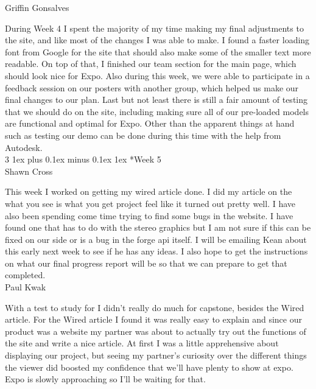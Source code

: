 \documentclass[letterpaper, 10pt, draftclsnofoot, compsoc, onecolumn]{IEEEtran}
\makeatletter
\def\subsubsection{\@startsection{subsubsection}%
                                 {3}%
                                 {\z@}%
                                 {1ex plus 0.1ex minus 0.1ex}%
                                 {1ex}%
                                 {\normalfont\normalsize}}%
\makeatother
\begin{document}
Griffin Gonsalves

During Week 4 I spent the majority of my time making my final adjustments to the site, and like most of the changes I was able to make. I found a faster loading font from Google for the site that should also make some of the smaller text more readable. On top of that, I finished our team section for the main page, which should look nice for Expo. Also during this week, we were able to participate in a feedback session on our posters with another group, which helped us make our final changes to our plan. Last but not least there is still a fair amount of testing that we should do on the site, including making sure all of our pre-loaded models are functional and optimal for Expo. Other than the apparent things at hand such as testing our demo can be done during this time with the help from Autodesk.\\

\subsubsection*{Week 5}\hspace*{\fill} \\
Shawn Cross

This week I worked on getting my wired article done. I did my article on the what you see is what you get project feel like it turned out pretty well. I have also been spending come time trying to find some bugs in the website. I have found one that has to do with the stereo graphics but I am not sure if this can be fixed on our side or is a bug in the forge api itself. I will be emailing Kean about this early next week to see if he has any ideas. I also hope to get the instructions on what our final progress report will be so that we can prepare to get that completed.\\

Paul Kwak

With a test to study for I didn't really do much for capstone, besides the Wired article. For the Wired article I found it was really easy to explain and since our product was a website my partner was about to actually try out the functions of the site and write a nice article. At first I was a little apprehensive about displaying our project, but seeing my partner's curiosity over the different things the viewer did boosted my confidence that we'll have plenty to show at expo. Expo is slowly approaching so I'll be waiting for that.\\
\end{document}
